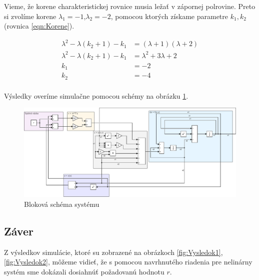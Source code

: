 \documentclass[../main.tex]{subfiles}
\begin{document}
Vieme, že korene charakteristickej rovnice musia ležať v zápornej polrovine. Preto si zvolíme korene $\lambda_1 = -1$,$\lambda_2 = -2$, pomocou ktorých získame parametre $k_1,k_2$ (rovnica \ref{eqn:Korene}).

\begin{equation}
\begin{split} 
\lambda^2 - \lambda(k_2+1) - k_1 & = (\lambda + 1)(\lambda + 2)\\ 
\lambda^2 - \lambda(k_2+1) - k_1 & = \lambda^2 + 3\lambda + 2\\ 
k_1 &= -2\\
k_2 &= -4\\
\end{split}
\label{eqn:Korene}
\end{equation}

Výsledky overíme simulačne pomocou schémy na obrázku \ref{fig:PrikladsRiadenim}.

\newpage
	

\begin{figure}[H]
	\begin{center}\includegraphics[scale=0.8,angle=90]{Rovnica1MVS.pdf}\end{center}
	\caption{Bloková schéma systému}
	\label{fig:PrikladsRiadenim}
\end{figure}


\newpage
\subsection{Záver}

Z výsledkov simulácie, ktoré su zobrazené na obrázkoch \ref{fig:Vysledok1}, \ref{fig:Vysledok2}, môžeme vidieť, že s pomocou navrhnutého riadenia pre nelinárny systém sme dokázali dosiahnúť požadovanú hodnotu $r$.
\end{document}
